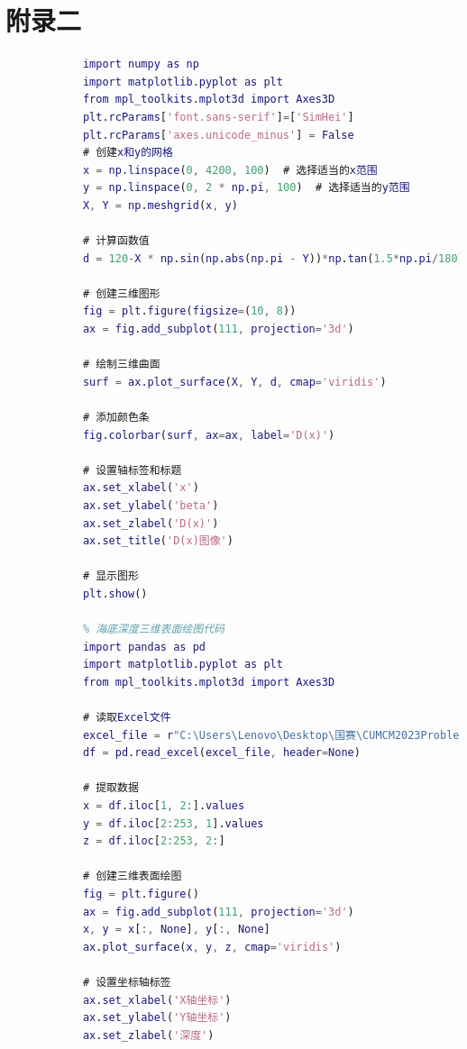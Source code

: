 \documentclass[withoutpreface,bwprint]{cumcmthesis} %
\begin{document}
    \section{附录二}
    \begin{appendices}
        \begin{lstlisting}[language=Matlab]
            % D(x)图像代码
            import numpy as np
            import matplotlib.pyplot as plt
            from mpl_toolkits.mplot3d import Axes3D
            plt.rcParams['font.sans-serif']=['SimHei']
            plt.rcParams['axes.unicode_minus'] = False
            # 创建x和y的网格
            x = np.linspace(0, 4200, 100)  # 选择适当的x范围
            y = np.linspace(0, 2 * np.pi, 100)  # 选择适当的y范围
            X, Y = np.meshgrid(x, y)

            # 计算函数值
            d = 120-X * np.sin(np.abs(np.pi - Y))*np.tan(1.5*np.pi/180)

            # 创建三维图形
            fig = plt.figure(figsize=(10, 8))
            ax = fig.add_subplot(111, projection='3d')

            # 绘制三维曲面
            surf = ax.plot_surface(X, Y, d, cmap='viridis')

            # 添加颜色条
            fig.colorbar(surf, ax=ax, label='D(x)')

            # 设置轴标签和标题
            ax.set_xlabel('x')
            ax.set_ylabel('beta')
            ax.set_zlabel('D(x)')
            ax.set_title('D(x)图像')

            # 显示图形
            plt.show()

            % 海底深度三维表面绘图代码
            import pandas as pd
            import matplotlib.pyplot as plt
            from mpl_toolkits.mplot3d import Axes3D

            # 读取Excel文件
            excel_file = r"C:\Users\Lenovo\Desktop\国赛\CUMCM2023Problems\附件.xlsx"
            df = pd.read_excel(excel_file, header=None)

            # 提取数据
            x = df.iloc[1, 2:].values
            y = df.iloc[2:253, 1].values
            z = df.iloc[2:253, 2:]

            # 创建三维表面绘图
            fig = plt.figure()
            ax = fig.add_subplot(111, projection='3d')
            x, y = x[:, None], y[:, None]
            ax.plot_surface(x, y, z, cmap='viridis')

            # 设置坐标轴标签
            ax.set_xlabel('X轴坐标')
            ax.set_ylabel('Y轴坐标')
            ax.set_zlabel('深度')


\end{lstlisting}
\end{appendices}
\end{document}
